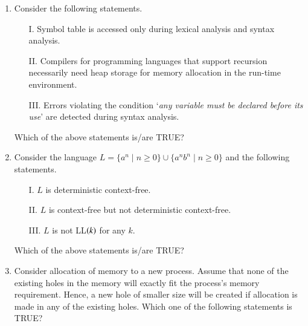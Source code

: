 \documentclass[journal,12pt,onecolumn]{IEEEtran}
\theoremstyle{remark}
\begin{document}
\begin{enumerate}
	\item Consider the following statements.
	\begin{enumerate}
		\item[I.] Symbol table is accessed only during lexical analysis and syntax analysis.
		\item[II.] Compilers for programming languages that support recursion necessarily need heap storage for memory allocation in the run-time environment.
		\item[III.] Errors violating the condition ‘\textit{any variable must be declared before its use}’ are detected during syntax analysis.
	\end{enumerate}
	Which of the above statements is/are TRUE?
	\hfill{}
	\begin{enumerate}
	\end{enumerate}
	
	\item Consider the language $L = \{a^n \mid n \ge 0\} \cup \{a^n b^n \mid n \ge 0\}$ and the following statements.
	\begin{enumerate}
		\item[I.] $L$ is deterministic context-free.
		\item[II.] $L$ is context-free but not deterministic context-free.
		\item[III.] $L$ is not LL$\left(k\right)$ for any $k$.
	\end{enumerate}
	Which of the above statements is/are TRUE?
	
	\hfill{}
	\begin{enumerate}
	\end{enumerate}
	
	
	\item Consider allocation of memory to a new process. Assume that none of the existing holes in the memory will exactly fit the process’s memory requirement. Hence, a new hole of smaller size will be created if allocation is made in any of the existing holes. Which one of the following statements is TRUE?
	

\end{enumerate}
\end{document}
